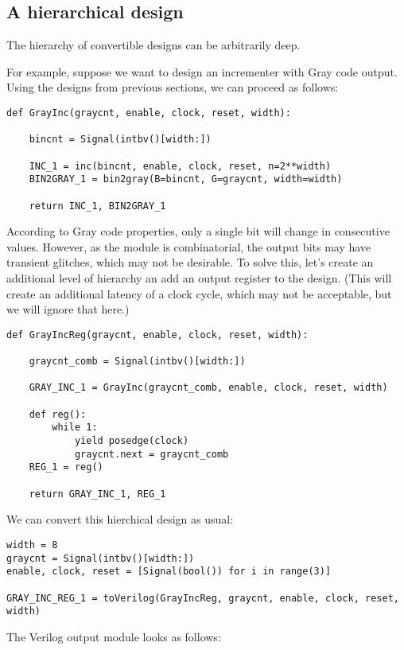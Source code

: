 \documentclass{howto}
\begin{document}
\subsection{A hierarchical design}
The hierarchy of convertible designs can be
arbitrarily deep.

For example, suppose we want to design an
incrementer with Gray code output. Using the
designs from previous sections, we can proceed
as follows:

\begin{verbatim}
def GrayInc(graycnt, enable, clock, reset, width):
    
    bincnt = Signal(intbv()[width:])
    
    INC_1 = inc(bincnt, enable, clock, reset, n=2**width)
    BIN2GRAY_1 = bin2gray(B=bincnt, G=graycnt, width=width)
    
    return INC_1, BIN2GRAY_1
\end{verbatim}

According to Gray code properties, only a single bit
will change in consecutive values. However, as the
 module is combinatorial, the output bits
may have transient glitches, which may not be desirable.
To solve this, let's create an additional level of
hierarchy an add an output register to the design.
(This will create an additional latency of a clock
cycle, which may not be acceptable, but we will
ignore that here.)

\begin{verbatim}
def GrayIncReg(graycnt, enable, clock, reset, width):
    
    graycnt_comb = Signal(intbv()[width:])
    
    GRAY_INC_1 = GrayInc(graycnt_comb, enable, clock, reset, width)
    
    def reg():
        while 1:
            yield posedge(clock)
            graycnt.next = graycnt_comb
    REG_1 = reg()
    
    return GRAY_INC_1, REG_1
\end{verbatim}

We can convert this hierchical design as usual:

\begin{verbatim}
width = 8
graycnt = Signal(intbv()[width:])
enable, clock, reset = [Signal(bool()) for i in range(3)]

GRAY_INC_REG_1 = toVerilog(GrayIncReg, graycnt, enable, clock, reset, width)
\end{verbatim}

The Verilog output module looks as follows:
\end{document}
